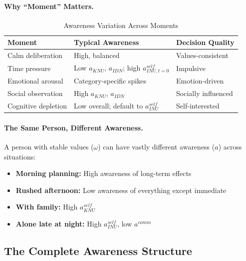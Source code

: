 \paragraph{Why ``Moment'' Matters.}

\begin{table}[htbp]
\centering
\caption{Awareness Variation Across Moments}
\label{tab:moment-variation}
\renewcommand{\arraystretch}{1.3}
\begin{tabular}{@{}lll@{}}
\toprule
\textbf{Moment} & \textbf{Typical Awareness} & \textbf{Decision Quality} \\
\midrule
Calm deliberation & High, balanced & Values-consistent \\
Time pressure & Low $a_{KNU}$, $a_{IDN}$; high $a^{self}_{INU,t=0}$ & Impulsive \\
Emotional arousal & Category-specific spikes & Emotion-driven \\
Social observation & High $a_{KNU}$, $a_{IDN}$ & Socially influenced \\
Cognitive depletion & Low overall; default to $a^{self}_{INU}$ & Self-interested \\
\bottomrule
\end{tabular}
\end{table}

\paragraph{The Same Person, Different Awareness.}
A person with stable values ($\omega$) can have vastly different awareness ($a$)
across situations:

\begin{itemize}
\item \textbf{Morning planning:} High awareness of long-term effects
\item \textbf{Rushed afternoon:} Low awareness of everything except immediate
\item \textbf{With family:} High $a^{self}_{KNU}$
\item \textbf{Alone late at night:} High $a^{self}_{INU}$, low $a^{comm}$
\end{itemize}

\subsection{The Complete Awareness Structure}
\label{subsec:complete-awareness}

